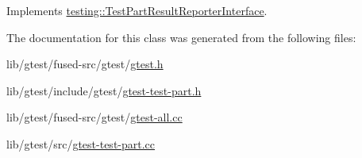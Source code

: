 Implements \hyperlink{classtesting_1_1_test_part_result_reporter_interface_aa2f920e7a5a0a6d0faf19e3727928c22}{testing\-::\-Test\-Part\-Result\-Reporter\-Interface}.



The documentation for this class was generated from the following files\-:\begin{DoxyCompactItemize}
\item 
lib/gtest/fused-\/src/gtest/\hyperlink{fused-src_2gtest_2gtest_8h}{gtest.\-h}\item 
lib/gtest/include/gtest/\hyperlink{gtest-test-part_8h}{gtest-\/test-\/part.\-h}\item 
lib/gtest/fused-\/src/gtest/\hyperlink{fused-src_2gtest_2gtest-all_8cc}{gtest-\/all.\-cc}\item 
lib/gtest/src/\hyperlink{gtest-test-part_8cc}{gtest-\/test-\/part.\-cc}\end{DoxyCompactItemize}
